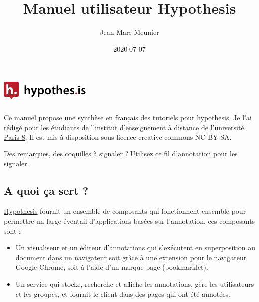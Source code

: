 \documentclass[
]{book}
\title{Manuel utilisateur Hypothesis}
\author{Jean-Marc Meunier}
\date{2020-07-07}
\providecommand{\tightlist}{%
  \setlength{\itemsep}{0pt}\setlength{\parskip}{0pt}}
\begin{document}
\frontmatter
\maketitle

{
\setcounter{tocdepth}{1}
\tableofcontents
}
\mainmatter
\hypertarget{section}{%
\chapter*{\texorpdfstring{\protect\includegraphics{img/hypothesislogomark.png}}{}}\label{section}}

Ce manuel propose une synthèse en français des \href{https://web.hypothes.is/help-categories/tutorials/}{tutoriels pour hypothesis}. Je l'ai rédigé pour les étudiants de l'institut d'enseignement à distance de \href{https://www.univ-paris8.fr/}{l'université Paris 8}. Il est mis à disposition sous licence creative commons NC-BY-SA.

Des remarques, des coquilles à signaler ? Utilisez \href{https://hyp.is/go?url=https\%3A\%2F\%2Fjmeunierp8.github.io\%2FGuide-utilisateur-Hypothesis\%2F\&group=__world__}{ce fil d'annotation} pour les signaler.

\hypertarget{a-quoi-uxe7a-sert}{%
\section*{A quoi ça sert ?}\label{a-quoi-uxe7a-sert}}

\href{https://web.hypothes.is/}{Hypothesis} fournit un ensemble de composants qui fonctionnent ensemble pour permettre un large éventail d'applications basées sur l'annotation. ces composants sont :

\begin{itemize}
\tightlist
\item
  Un visualiseur et un éditeur d'annotations qui s'exécutent en superposition au document dans un navigateur soit grâce à une extension pour le navigateur Google Chrome, soit à l'aide d'un marque-page (bookmarklet).
\item
  Un service qui stocke, recherche et affiche les annotations, gère les utilisateurs et les groupes, et fournit le client dans des pages qui ont été annotées.
\end{itemize}
\end{document}
